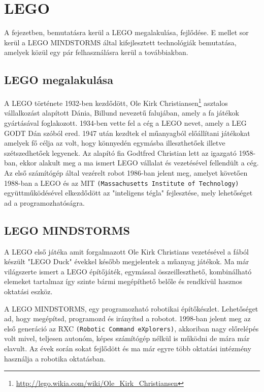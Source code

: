 \chapter{LEGO} \label{ch:ROBOT}

\begin{osszefoglal}
A fejezetben, bemutatásra kerül a LEGO \cite{lego} megalakulása, fejlődése. E mellet sor kerül a LEGO MINDSTORMS által kifejlesztett technológiák bemutatása, amelyek közül egy pár felhasználásra kerül a továbbiakban.
\end{osszefoglal}

\section{LEGO megalakulása}\label{sec:ROBOT:lego}
A LEGO története 1932-ben kezdődött, Ole Kirk Christiansen\footnote{\href {http://lego.wikia.com/wiki/Ole\_Kirk\_Christiansen}{http://lego.wikia.com/wiki/Ole\_Kirk\_Christiansen}} asztalos vállalkozást alapított Dánia, Billund nevezetű falujában, amely a fa játékok gyártásával foglakozott. 1934-ben vette fel a cég a LEGO nevet, amely a LEG GODT Dán szóból ered. 1947 után kezdtek el műanyagból előállítani játékokat amelyek fő célja az volt, hogy könnyedén egymásba illeszthetőek illetve szétszedhetőek legyenek. Az alapító fia Godtfred Christian lett az igazgató 1958-ban, ekkor alakult meg a ma ismert LEGO vállalat és vezetésével fellendült a cég. Az első számítógép által vezérelt robot 1986-ban jelent meg, amelyet követően 1988-ban a LEGO és az MIT \texttt{(Massachusetts Institute of Technology)} együttműködésével elkezdődött az "inteligens tégla" fejlesztése, mely lehetőséget ad a programozhatóságra.

\section{LEGO MINDSTORMS}\label{sec:ROBOT:mindstorms}
A LEGO  első játéka amit forgalmazott Ole Kirk Christians vezetésével a fából készült "LEGO Duck" évekkel később megjelentek a műanyag játékok. Ma már világszerte ismert a LEGO építőjáték, egymással összeilleszthető, kombinálható elemeket tartalmaz így szinte bármi megépíthető belőle és rendkívül hasznos oktatási eszköz. 

A LEGO MINDSTORMS, egy programozható robotikai építőkészlet. Lehetőséget ad, hogy megépítsd, programozd és irányítsd a robotot.
1998-ban jelent meg az első generáció az RXC \texttt{(Robotic Command eXplorers)}, akkoriban nagy előrelépés volt mivel, teljesen autonóm, képes számítógép nélkül is működni de mára már elavult. Az évek során sokat fejlődött és ma már egyre több oktatási intézmény használja a robotika oktatásban.


